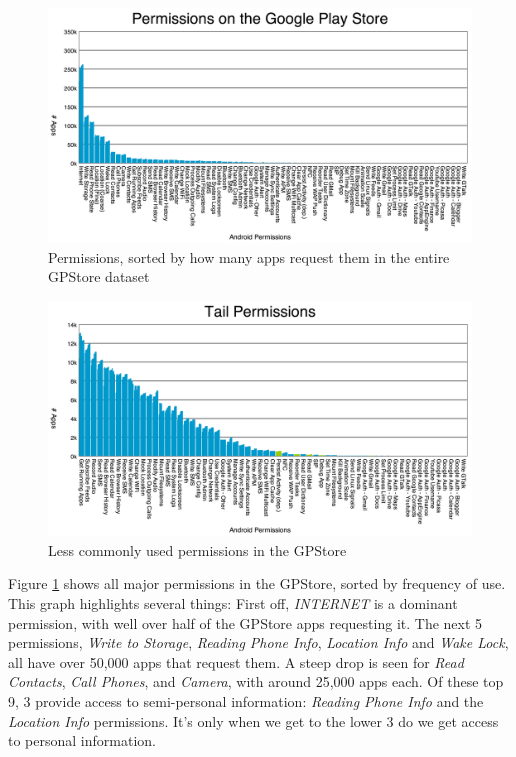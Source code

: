 \begin{figure}[h]
\begin{center}
\includegraphics[width=1.0\columnwidth]{figs/AllPermissions}
\caption{Permissions, sorted by how many apps request them in the entire GPStore dataset}
\label{fig:allpermissions}
\end{center}
\end{figure}

\begin{figure}[h]
\begin{center}
\includegraphics[width=1.0\columnwidth]{figs/AllPermissions_Tail}
\caption{Less commonly used permissions in the GPStore}
\label{fig:tailpermissions}
\end{center}
\end{figure}

Figure \ref{fig:allpermissions} shows all major permissions in the GPStore, sorted by frequency of use. This graph highlights several things: First off, \textit{INTERNET} is a dominant permission, with well over half of the GPStore apps requesting it. The next 5 permissions, \textit{Write to Storage}, \textit{Reading Phone Info}, \textit{Location Info} and \textit{Wake Lock}, all have over 50,000 apps that request them. A steep drop is seen for \textit{Read Contacts}, \textit{Call Phones}, and \textit{Camera}, with around 25,000 apps each. Of these top 9, 3 provide access to semi-personal information: \textit{Reading Phone Info} and the \textit{Location Info} permissions. It's only when we get to the lower 3 do we get access to personal information. 

